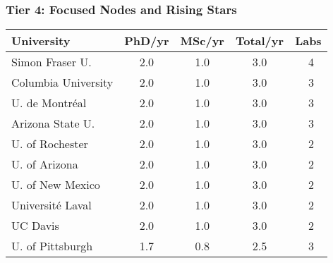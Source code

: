 \documentclass[aspectratio=169]{beamer}
\newcommand{\tabletext}{\normalsize}
\begin{document}
\begin{frame}
    \frametitle{Tier 4: Focused Nodes and Rising Stars}
    \subtitle{Producers with 1-3 total theses per year, often with deep specialization.}
    
    \begin{table}
        \centering
        \tabletext
        \begin{tabularx}{\textwidth}{
            l
            S[table-format=1.1]
            S[table-format=1.1]
            S[table-format=1.1]
            S[table-format=2.0, table-space-text-pre=~]
        }
            \toprule
            \textbf{University} & {\textbf{PhD/yr}} & {\textbf{MSc/yr}} & {\textbf{Total/yr}} & {\textbf{Labs}} \\
            \midrule
            Simon Fraser U. & 2.0 & 1.0 & 3.0 & ~4 \\
            Columbia University & 2.0 & 1.0 & 3.0 & ~3 \\
            U. de Montréal & 2.0 & 1.0 & 3.0 & ~3 \\
            Arizona State U. & 2.0 & 1.0 & 3.0 & ~3 \\
            U. of Rochester & 2.0 & 1.0 & 3.0 & ~2 \\
            U. of Arizona & 2.0 & 1.0 & 3.0 & ~2 \\
            U. of New Mexico & 2.0 & 1.0 & 3.0 & ~2 \\
            Université Laval & 2.0 & 1.0 & 3.0 & ~2 \\
            UC Davis & 2.0 & 1.0 & 3.0 & ~2 \\
            U. of Pittsburgh & 1.7 & 0.8 & 2.5 & ~3 \\
            \bottomrule
        \end{tabularx}
    \end{table}
\end{frame}
\end{document}
